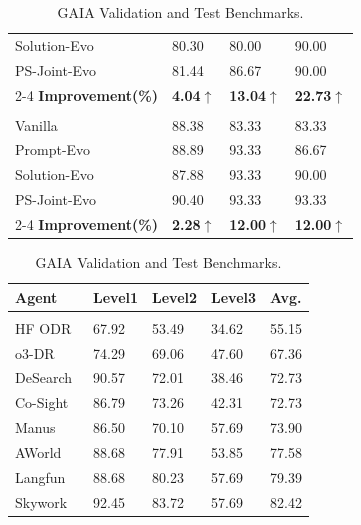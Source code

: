 \documentclass{article}
\theoremstyle{plain}
\theoremstyle{definition}
\theoremstyle{remark}
\begin{document}
\begin{table}[h]
\begin{minipage}[t]{0.5\textwidth}
\begin{tabular}{p{2.8cm}p{1.0cm}p{1.0cm}p{1.0cm}}
Solution-Evo   & 80.30 & 80.00 & 90.00 \\
PS-Joint-Evo   & 81.44 & 86.67 & 90.00 \\
\cmidrule{2-4}
\textbf{Improvement(\%)} & \textbf{4.04$\uparrow$} & \textbf{13.04$\uparrow$} & \textbf{22.73$\uparrow$} \\
\midrule
\rowcolor{gray!15} \multicolumn{4}{c}{\textit{\textbf{gemini-3-flash-preview}}} \\
Vanilla        & 88.38 & 83.33 & 83.33 \\
Prompt-Evo     & 88.89 & 93.33 & 86.67 \\
Solution-Evo   & 87.88 & 93.33 & 90.00 \\
PS-Joint-Evo   & 90.40 & 93.33 & 93.33 \\
\cmidrule{2-4}
\textbf{Improvement(\%)} & \textbf{2.28$\uparrow$} & \textbf{12.00$\uparrow$} & \textbf{12.00$\uparrow$} \\
\bottomrule
\end{tabular}
\end{minipage}
\hfill
\begin{minipage}[t]{0.5\textwidth}
\centering
\scriptsize
\renewcommand{\arraystretch}{0.86}
\setlength{\tabcolsep}{2pt}
\caption{GAIA Validation and Test Benchmarks.}
\label{tab:results2}
\begin{tabular}{p{2.8cm}p{0.8cm}p{0.8cm}p{0.8cm}p{0.8cm}}
\toprule
\textbf{Agent} & \textbf{Level1} & \textbf{Level2} & \textbf{Level3} & \textbf{Avg.} \\
\midrule
\rowcolor{gray!15} \multicolumn{5}{c}{\textit{\textbf{Validation}}} \\
HF ODR~\citep{huggingface_open_deep_research_2024} & 67.92 & 53.49 & 34.62 & 55.15 \\
o3-DR~\citep{openai2025deepresearch}      & 74.29 & 69.06 & 47.60 & 67.36 \\
DeSearch~\citep{desearchai2024desearch}   & 90.57 & 72.01 & 38.46 & 72.73 \\
Co-Sight~\citep{zhang2025cosight}        & 86.79 & 73.26 & 42.31 & 72.73 \\
Manus~\citep{shen2025mindmachinerisemanus} & 86.50 & 70.10 & 57.69 & 73.90 \\
AWorld~\citep{yu2025aworld}              & 88.68 & 77.91 & 53.85 & 77.58 \\
Langfun~\citep{google2024langfun}        & 88.68 & 80.23 & 57.69 & 79.39 \\
Skywork~\citep{skywork2025superagents}   & 92.45 & 83.72 & 57.69 & 82.42 \\

\end{tabular}
\end{minipage}
\end{table}
\end{document}
